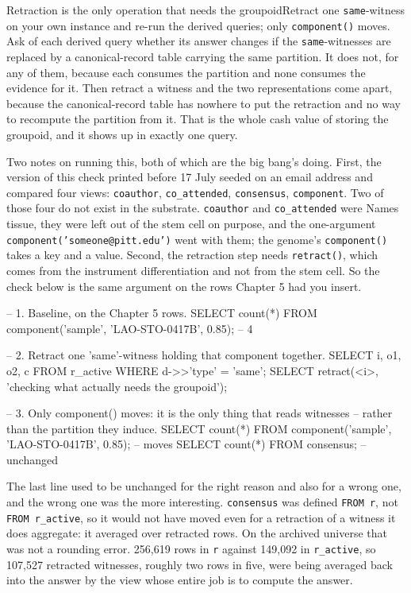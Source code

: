\begin{Correspondence}{Retraction is the only operation that needs the groupoid}{Retract one \texttt{same}-witness on your own instance and re-run the derived queries; only \texttt{component()} moves.}
Ask of each derived query whether its answer changes if the \texttt{same}-witnesses are replaced by a canonical-record table carrying the same partition. It does not, for any of them, because each consumes the partition and none consumes the evidence for it. Then retract a witness and the two representations come apart, because the canonical-record table has nowhere to put the retraction and no way to recompute the partition from it. That is the whole cash value of storing the groupoid, and it shows up in exactly one query.

Two notes on running this, both of which are the big bang's doing. First, the version of this check printed before 17 July seeded on an email address and compared four views: \texttt{coauthor}, \texttt{co\_attended}, \texttt{consensus}, \texttt{component}. Two of those four do not exist in the substrate. \texttt{coauthor} and \texttt{co\_attended} were Names tissue, they were left out of the stem cell on purpose, and the one-argument \texttt{component('someone@pitt.edu')} went with them; the genome's \texttt{component()} takes a key and a value. Second, the retraction step needs \texttt{retract()}, which comes from the instrument differentiation and not from the stem cell. So the check below is the same argument on the rows Chapter 5 had you insert.

\begin{Check}
-- 1. Baseline, on the Chapter 5 rows.
SELECT count(*) FROM component('sample', 'LAO-STO-0417B', 0.85);   -- 4

-- 2. Retract one 'same'-witness holding that component together.
SELECT i, o1, o2, c FROM r_active WHERE d->>'type' = 'same';
SELECT retract(<i>, 'checking what actually needs the groupoid');

-- 3. Only component() moves: it is the only thing that reads witnesses
--    rather than the partition they induce.
SELECT count(*) FROM component('sample', 'LAO-STO-0417B', 0.85);   -- moves
SELECT count(*) FROM consensus;                                    -- unchanged
\end{Check}

The last line used to be unchanged for the right reason and also for a wrong one, and the wrong one was the more interesting. \texttt{consensus} was defined \texttt{FROM r}, not \texttt{FROM r\_active}, so it would not have moved even for a retraction of a witness it does aggregate: it averaged over retracted rows. On the archived universe that was not a rounding error. 256,619 rows in \texttt{r} against 149,092 in \texttt{r\_active}, so 107,527 retracted witnesses, roughly two rows in five, were being averaged back into the answer by the view whose entire job is to compute the answer.


\end{Correspondence}
